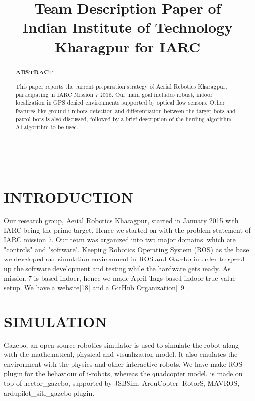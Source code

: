 \documentclass[12pt]{article}
\title{Team Description Paper of \\
Indian Institute of Technology Kharagpur for IARC}
\begin{document}
\maketitle
\\

\begin{abstract}

\begin{center}\textbf{ABSTRACT}\end{center}
This paper reports the current preparation strategy of Aerial Robotics Kharagpur,
participating in IARC Mission 7 2016. Our main goal includes robust, indoor 
localization in GPS denied environments supported by optical flow sensors. 
Other features like ground i-robots detection and differentiation between the 
target bots and patrol bots is also discussed, followed by a brief description 
of the herding algorithm AI algorithm to be used.
\end{abstract}


\section{INTRODUCTION}
Our research group, Aerial Robotics Kharagpur, started in January 2015 with IARC 
being the prime target. Hence we started on with the problem statement of IARC 
mission 7. Our team was organized into two major domains, which are "controls" 
and "software". Keeping Robotics Operating System (ROS) as the base we developed 
our simulation environment in ROS and Gazebo in order to speed up the software 
development and testing while the hardware gets ready. As mission 7 is based 
indoor, hence we made April Tags based indoor true value setup. We have a website[18] 
and a GitHub Organization[19].

\section{SIMULATION}
Gazebo, an open source robotics simulator is used to simulate the robot along with 
the mathematical, physical and visualization model. It also emulates the environment 
with the physics and other interactive robots. We have make ROS plugin for the behaviour 
of i-robots, whereas the quadcopter model,
is made on top of hector\_gazebo, supported by JSBSim, ArduCopter, RotorS, MAVROS,
ardupilot\_sitl\_gazebo plugin.
\end{document}
